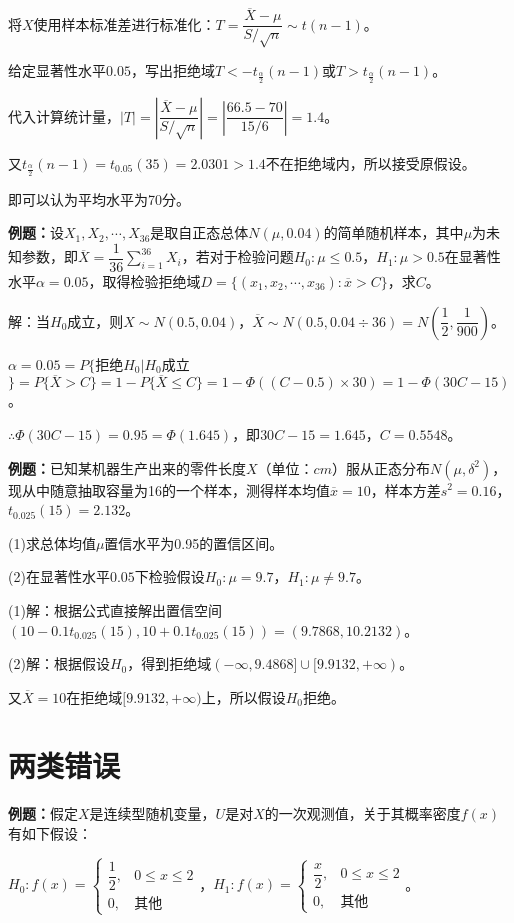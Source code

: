 将$X$使用样本标准差进行标准化：$T=\dfrac{\overline{X}-\mu}{S/\sqrt{n}}\sim t(n-1)$。

给定显著性水平$0.05$，写出拒绝域$T<-t_{\frac{\alpha}{2}}(n-1)$或$T>t_{\frac{\alpha}{2}}(n-1)$。

代入计算统计量，$\vert T\vert=\left\vert\dfrac{\overline{X}-\mu}{S/\sqrt{n}}\right\vert=\left\vert\dfrac{66.5-70}{15/6}\right\vert=1.4$。

又$t_{\frac{\alpha}{2}}(n-1)=t_{0.05}(35)=2.0301>1.4$不在拒绝域内，所以接受原假设。

即可以认为平均水平为70分。

\textbf{例题：}设$X_1,X_2,\cdots,X_{36}$是取自正态总体$N(\mu,0.04)$的简单随机样本，其中$\mu$为未知参数，即$\overline{X}=\dfrac{1}{36}\sum\limits_{i=1}^{36}X_i$，若对于检验问题$H_0:\mu\leqslant0.5$，$H_1:\mu>0.5$在显著性水平$\alpha=0.05$，取得检验拒绝域$D=\{(x_1,x_2,\cdots,x_{36}):\overline{x}>C\}$，求$C$。

解：当$H_0$成立，则$X\sim N(0.5,0.04)$，$\overline{X}\sim N(0.5,0.04\div36)=N\left(\dfrac{1}{2},\dfrac{1}{900}\right)$。

$\alpha=0.05=P\{$拒绝$H_0|H_0$成立$\}=P\{\overline{X}>C\}=1-P\{\overline{X}\leqslant C\}=1-\varPhi((C-0.5)\times30)=1-\varPhi(30C-15)$。

$\therefore\varPhi(30C-15)=0.95=\varPhi(1.645)$，即$30C-15=1.645$，$C=0.5548$。

\textbf{例题：}已知某机器生产出来的零件长度$X$（单位：$cm$）服从正态分布$N(\mu,\delta^2)$，现从中随意抽取容量为16的一个样本，测得样本均值$\overline{x}=10$，样本方差$s^2=0.16$，$t_{0.025}(15)=2.132$。

(1)求总体均值$\mu$置信水平为0.95的置信区间。

(2)在显著性水平$0.05$下检验假设$H_0:\mu=9.7$，$H_1:\mu\neq9.7$。

(1)解：根据公式直接解出置信空间$(10-0.1t_{0.025}(15),10+0.1t_{0.025}(15))=(9.7868,10.2132)$。

(2)解：根据假设$H_0$，得到拒绝域$(-\infty,9.4868]\cup[9.9132,+\infty)$。

又$\overline{X}=10$在拒绝域$[9.9132,+\infty)$上，所以假设$H_0$拒绝。

\section{两类错误}

\textbf{例题：}假定$X$是连续型随机变量，$U$是对$X$的一次观测值，关于其概率密度$f(x)$有如下假设：

$H_0:f(x)=\left\{\begin{array}{ll}
    \dfrac{1}{2}, & 0\leqslant x\leqslant2 \\
    0, & \text{其他}
\end{array}\right.$，$H_1:f(x)=\left\{\begin{array}{ll}
    \dfrac{x}{2}, & 0\leqslant x\leqslant2 \\
    0, & \text{其他}
\end{array}\right.$。


